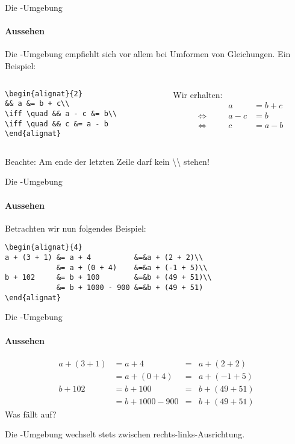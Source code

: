 \begin{frame}[fragile]{Die -Umgebung}
\framesubtitle{Aussehen} 
Die -Umgebung empfiehlt sich vor allem bei Umformen von Gleichungen. Ein Beispiel:
\begin{columns}
\begin{column}{.5\textwidth}
\begin{codeblock}
\begin{verbatim}
\begin{alignat}{2}
&& a &= b + c\\
\iff \quad && a - c &= b\\
\iff \quad && c &= a - b
\end{alignat}
\end{verbatim}
\end{codeblock}
\end{column}

\begin{column}{.4\textwidth}
Wir erhalten:
\begin{alignat}{2}
&& a &= b + c\\
\iff \quad && a - c &= b\\
\iff \quad && c &= a - b
\end{alignat}
\end{column}
\end{columns}
\pause
Beachte: \alert{Am ende der letzten Zeile darf kein \textbackslash\textbackslash{} stehen!}
\end{frame}

\begin{frame}[fragile]{Die -Umgebung}
\framesubtitle{Aussehen}
Betrachten wir nun folgendes Beispiel: 

\begin{codeblock}
\begin{verbatim}
\begin{alignat}{4}
a + (3 + 1) &= a + 4          &=&a + (2 + 2)\\
            &= a + (0 + 4)    &=&a + (-1 + 5)\\
b + 102     &= b + 100        &=&b + (49 + 51)\\
            &= b + 1000 - 900 &=&b + (49 + 51)
\end{alignat}
\end{verbatim}
\end{codeblock}
\end{frame}

\begin{frame}{Die -Umgebung}
\framesubtitle{Aussehen}
\begin{alignat}{4}
a + (3 + 1) &= a + 4          &=&a + (2 + 2)\\
            &= a + (0 + 4)    &=&a + (-1 + 5)\\
b + 102     &= b + 100        &=&b + (49 + 51)\\
            &= b + 1000 - 900 &=&b + (49 + 51)
\end{alignat}
Was fällt auf?

\medskip
\pause
Die -Umgebung wechselt stets zwischen rechts-links-Ausrichtung.
\end{frame}

